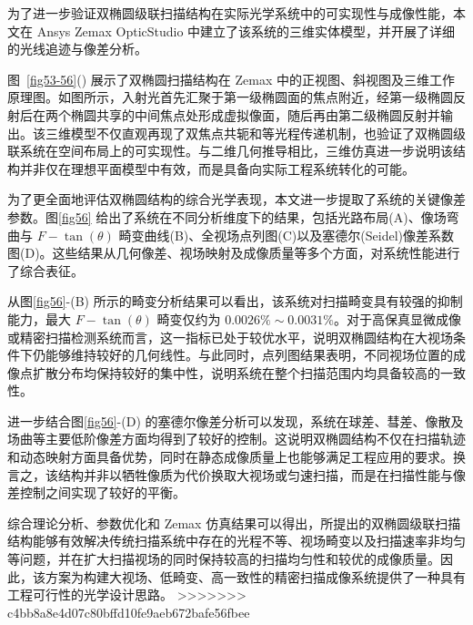 为了进一步验证双椭圆级联扫描结构在实际光学系统中的可实现性与成像性能，本文在 Ansys Zemax OpticStudio 中建立了该系统的三维实体模型，并开展了详细的光线追迹与像差分析。

图~\ref{fig53-56}() 展示了双椭圆扫描结构在 Zemax 中的正视图、斜视图及三维工作原理图。如图所示，入射光首先汇聚于第一级椭圆面的焦点附近，经第一级椭圆反射后在两个椭圆共享的中间焦点处形成虚拟像面，随后再由第二级椭圆反射并输出。该三维模型不仅直观再现了双焦点共轭和等光程传递机制，也验证了双椭圆级联系统在空间布局上的可实现性。与二维几何推导相比，三维仿真进一步说明该结构并非仅在理想平面模型中有效，而是具备向实际工程系统转化的可能。

为了更全面地评估双椭圆结构的综合光学表现，本文进一步提取了系统的关键像差参数。图\ref{fig56} 给出了系统在不同分析维度下的结果，包括光路布局(A)、像场弯曲与 $F-\tan(\theta)$ 畸变曲线(B)、全视场点列图(C)以及塞德尔(Seidel)像差系数图(D)。这些结果从几何像差、视场映射及成像质量等多个方面，对系统性能进行了综合表征。

从图\ref{fig56}-(B) 所示的畸变分析结果可以看出，该系统对扫描畸变具有较强的抑制能力，最大 $F-\tan(\theta)$ 畸变仅约为 $0.0026\%\sim0.0031\%$。对于高保真显微成像或精密扫描检测系统而言，这一指标已处于较优水平，说明双椭圆结构在大视场条件下仍能够维持较好的几何线性。与此同时，点列图结果表明，不同视场位置的成像点扩散分布均保持较好的集中性，说明系统在整个扫描范围内均具备较高的一致性。

进一步结合图\ref{fig56}-(D) 的塞德尔像差分析可以发现，系统在球差、彗差、像散及场曲等主要低阶像差方面均得到了较好的控制。这说明双椭圆结构不仅在扫描轨迹和动态映射方面具备优势，同时在静态成像质量上也能够满足工程应用的要求。换言之，该结构并非以牺牲像质为代价换取大视场或匀速扫描，而是在扫描性能与像差控制之间实现了较好的平衡。

综合理论分析、参数优化和 Zemax 仿真结果可以得出，所提出的双椭圆级联扫描结构能够有效解决传统扫描系统中存在的光程不等、视场畸变以及扫描速率非均匀等问题，并在扩大扫描视场的同时保持较高的扫描均匀性和较优的成像质量。因此，该方案为构建大视场、低畸变、高一致性的精密扫描成像系统提供了一种具有工程可行性的光学设计思路。
>>>>>>> c4bb8a8e4d07c80bffd10fe9aeb672bafe56fbee
